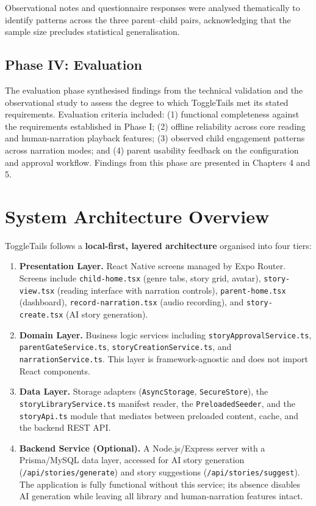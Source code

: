 Observational notes and questionnaire responses were analysed thematically to identify patterns across the three parent--child pairs, acknowledging that the sample size precludes statistical generalisation.

\subsection{Phase IV: Evaluation}

The evaluation phase synthesised findings from the technical validation and the observational study to assess the degree to which ToggleTails met its stated requirements. Evaluation criteria included: (1) functional completeness against the requirements established in Phase I; (2) offline reliability across core reading and human-narration playback features; (3) observed child engagement patterns across narration modes; and (4) parent usability feedback on the configuration and approval workflow. Findings from this phase are presented in Chapters 4 and 5.

\section{System Architecture Overview}

ToggleTails follows a \textbf{local-first, layered architecture} organised into four tiers:

\begin{enumerate}
    \item \textbf{Presentation Layer.} React Native screens managed by Expo Router. Screens include \texttt{child-home.tsx} (genre tabs, story grid, avatar), \texttt{story-view.tsx} (reading interface with narration controls), \texttt{parent-home.tsx} (dashboard), \texttt{record-narration.tsx} (audio recording), and \texttt{story-create.tsx} (AI story generation).
    \item \textbf{Domain Layer.} Business logic services including \texttt{storyApprovalService.ts}, \texttt{parentGateService.ts}, \texttt{storyCreationService.ts}, and \texttt{narrationService.ts}. This layer is framework-agnostic and does not import React components.
    \item \textbf{Data Layer.} Storage adapters (\texttt{AsyncStorage}, \texttt{SecureStore}), the \texttt{storyLibraryService.ts} manifest reader, the \texttt{PreloadedSeeder}, and the \texttt{storyApi.ts} module that mediates between preloaded content, cache, and the backend REST API.
    \item \textbf{Backend Service (Optional).} A Node.js/Express server with a Prisma/MySQL data layer, accessed for AI story generation (\texttt{/api/stories/generate}) and story suggestions (\texttt{/api/stories/suggest}). The application is fully functional without this service; its absence disables AI generation while leaving all library and human-narration features intact.
\end{enumerate}

